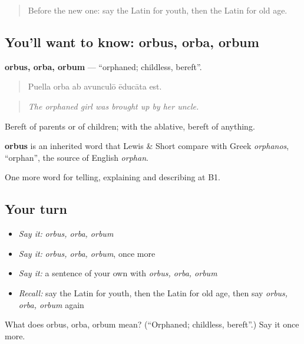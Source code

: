 \begin{quote}
Before the new one: say the Latin for youth, then the Latin for old age.
\end{quote}

\subsection*{You'll want to know: orbus, orba, orbum}
\textbf{orbus, orba, orbum} — \textquotedblleft{}orphaned; childless, bereft\textquotedblright{}.

\begin{quote}
Puella orba ab avunculō ēducāta est.
\end{quote}

\begin{quote}
\emph{The orphaned girl was brought up by her uncle.}
\end{quote}

Bereft of parents or of children; with the ablative, bereft of anything.

\begin{cousinweb}
\textbf{orbus} is an inherited word that Lewis \& Short compare with Greek \emph{orphanos}, \textquotedblleft{}orphan\textquotedblright{}, the source of English \emph{orphan}.
\end{cousinweb}

\begin{grammarlens}[title={What you've built}]
One more word for telling, explaining and describing at B1.
\end{grammarlens}

\subsection*{Your turn}
\begin{itemize}
\raggedright
  \item \emph{Say it:} \emph{orbus, orba, orbum}
  \item \emph{Say it:} \emph{orbus, orba, orbum}, once more
  \item \emph{Say it:} a sentence of your own with \emph{orbus, orba, orbum}
  \item \emph{Recall:} say the Latin for youth, then the Latin for old age, then say \emph{orbus, orba, orbum} again
\end{itemize}

\begin{tcolorbox}[breakable,colback=teal!4,colframe=teal!35!black,title={Before you move on}]
What does orbus, orba, orbum mean? (\textquotedblleft{}Orphaned; childless, bereft\textquotedblright{}.) Say it once more.
\end{tcolorbox}
